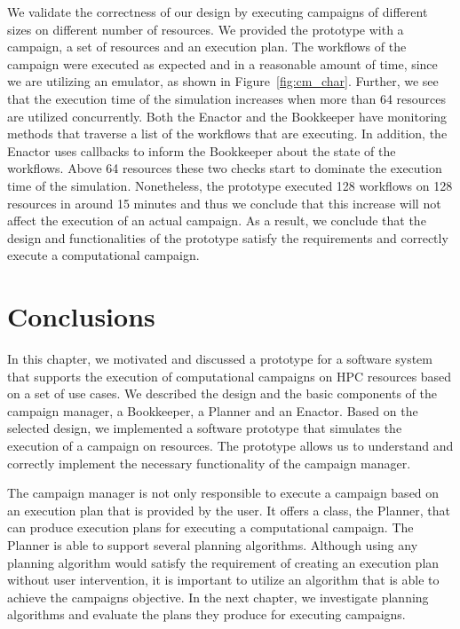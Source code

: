 We validate the correctness of our design by executing campaigns of different 
sizes on different number of resources. We provided the prototype with a 
campaign, a set of resources and an execution plan. The workflows of the 
campaign were executed as expected and in a reasonable amount of time, since 
we are utilizing an emulator, as shown in Figure~\ref{fig:cm_char}. Further, 
we see that the execution time of the simulation increases when more than 64 
resources are utilized concurrently. Both the Enactor and the Bookkeeper have 
monitoring methods that traverse a list of the workflows that are executing. 
In addition, the Enactor uses callbacks to inform the Bookkeeper about the 
state of the workflows. Above 64 resources these two checks start to dominate 
the execution time of the simulation. Nonetheless, the prototype executed 128 
workflows on 128 resources in around 15 minutes and thus we conclude that this 
increase will not affect the execution of an actual campaign. As a result, we 
conclude that the design and functionalities of the prototype satisfy the 
requirements and correctly execute a computational campaign.


\section{Conclusions}
\label{sec:cm_concl}
In this chapter, we motivated and discussed a prototype for a software system 
that supports the execution of computational campaigns on HPC resources based 
on a set of use cases. We described the design and the basic components of the 
campaign manager, a Bookkeeper, a Planner and an Enactor. Based on the 
selected design, we implemented a software prototype that simulates the 
execution of a campaign on resources. The prototype allows us to understand 
and correctly implement the necessary functionality of the campaign manager.

The campaign manager is not only responsible to execute a campaign based on an 
execution plan that is provided by the user. It offers a class, the Planner, 
that can produce execution plans for executing a computational campaign. The 
Planner is able to support several planning algorithms. Although using any 
planning algorithm would satisfy the requirement of creating an execution plan 
without user intervention, it is important to utilize an algorithm that is 
able to achieve the campaigns objective. In the next chapter, we investigate 
planning algorithms and evaluate the plans they produce for executing 
campaigns.

